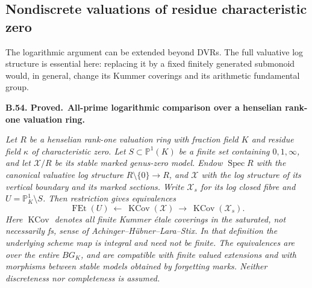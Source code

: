 \documentclass[11pt,a4paper]{article}
\providecommand{\mathscr}{\mathcal}
\newenvironment{claim}[3]{\par\medskip\noindent\hypertarget{#1}{\textbf{#1. #2.}}\ \textbf{#3.}\par\nopagebreak\smallskip\begingroup\itshape}{\endgroup\par\smallskip}
\begin{document}
\subsection{Nondiscrete valuations of residue characteristic zero}

The logarithmic argument can be extended beyond DVRs. The full
valuative log structure is essential here: replacing it by a fixed
finitely generated submonoid would, in general, change its Kummer
coverings and its arithmetic fundamental group.

\begin{claim}{B.54}{Proved}{All-prime logarithmic comparison over a henselian rank-one valuation ring}
Let $R$ be a henselian rank-one valuation ring with fraction field $K$
and residue field $\kappa$ of characteristic zero. Let
$S\subset\mathbb P^1(K)$ be a finite set containing $0,1,\infty$,
and let $\mathscr X/R$ be its stable marked genus-zero model.
Endow $\operatorname{Spec}R$ with the canonical valuative log
structure $R\setminus\{0\}\to R$, and $\mathscr X$ with the
log structure of its vertical boundary and its marked sections.
Write $\mathscr X_s$ for its log closed fibre and
$U=\mathbb P^1_K\setminus S$. Then restriction gives equivalences
\[
 \operatorname{FEt}(U)
 \ \longleftarrow\
 \operatorname{KCov}(\mathscr X)
 \ \longrightarrow\
 \operatorname{KCov}(\mathscr X_s).                 \tag{B.LIT.1}
\]
Here $\operatorname{KCov}$ denotes all finite Kummer \'etale
coverings in the saturated, not necessarily fs, sense of
Achinger--H\"ubner--Lara--Stix. In that definition the underlying
scheme map is integral and need not be finite. The equivalences
are over the entire $BG_K$, and are compatible with finite valued
extensions and with morphisms between stable models obtained by
forgetting marks. Neither discreteness nor completeness is assumed.
\end{claim}
\end{document}
